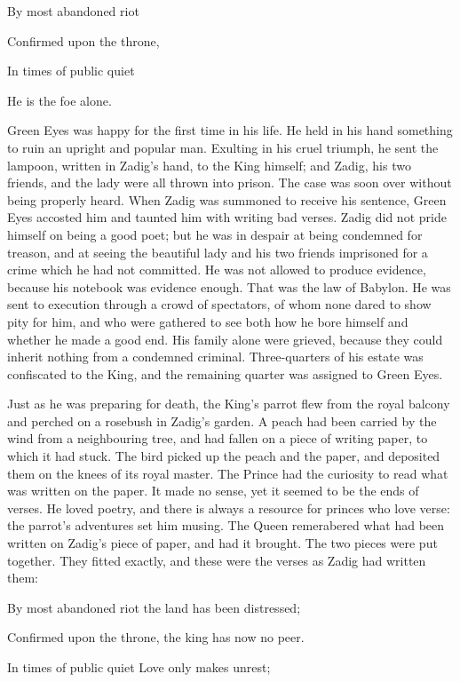 \documentclass{article}
\begin{document}
\begin{center}
By most abandoned riot 

Confirmed upon the throne, 

In times of public quiet 

He is the foe alone. 

Green Eyes was happy for the first time in his life. He held in his hand something 
to ruin an upright and popular man. Exulting in his cruel triumph, he sent the 
lampoon, written in Zadig's hand, to the King himself; and Zadig, his two friends, 
and the lady were all thrown into prison. The case was soon over without being 
properly heard. When Zadig was summoned to receive his sentence, Green Eyes accosted 
him and taunted him with writing bad verses. Zadig did not pride himself on being 
a good poet; but he was in despair at being condemned for treason, and at seeing 
the beautiful lady and his two friends imprisoned for a crime which he had not 
committed. He was not allowed to produce evidence, because his notebook was evidence 
enough. That was the law of Babylon. He was sent to execution through a crowd of 
spectators, of whom none dared to show pity for him, and who were gathered to see 
both how he bore himself and whether he made a good end. His family alone were 
grieved, because they could inherit nothing from a condemned criminal. Three-quarters 
of his estate was confiscated to the King, and the remaining quarter was assigned 
to Green Eyes. 

Just as he was preparing for death, the King's parrot flew from the royal balcony 
and perched on a rosebush in Zadig's garden. A peach had been carried by the wind 
from a neighbouring tree, and had fallen on a piece of writing paper, to which 
it had stuck. The bird picked up the peach and the paper, and deposited them on 
the knees of its royal master. The Prince had the curiosity to read what was written 
on the paper. It made no sense, yet it seemed to be the ends of verses. He loved 
poetry, and there is always a resource for princes who love verse: the parrot's 
adventures set him musing. The Queen remerabered what had been written on Zadig's 
piece of paper, and had it brought. The two pieces were put together. They fitted 
exactly, and these were the verses as Zadig had written them: 

By most abandoned riot the land has been distressed; 

Confirmed upon the throne, the king has now no peer. 

In times of public quiet Love only makes unrest; 


\end{center}
\end{document}
